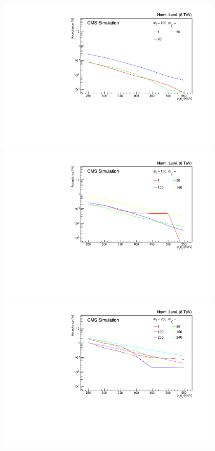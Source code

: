 \begin{figure}[ht!]
  \begin{center}
  \includegraphics[scale=0.35]{Figures/sus13009/limitplots/plots/sbottom/acceptance_100.pdf}
  \includegraphics[scale=0.35]{Figures/sus13009/limitplots/plots/sbottom/acceptance_150.pdf}
  \includegraphics[scale=0.35]{Figures/sus13009/limitplots/plots/sbottom/acceptance_250.pdf}

\end{center}
\end{figure}
